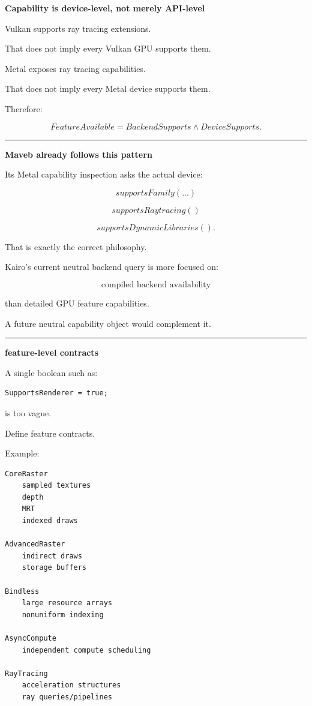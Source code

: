 \textbf{Capability is device-level, not merely API-level}

Vulkan supports ray tracing extensions.

That does not imply every Vulkan GPU supports them.

Metal exposes ray tracing capabilities.

That does not imply every Metal device supports them.

Therefore:

\[
\boxed{
FeatureAvailable
=
BackendSupports
\land
DeviceSupports.
}
\]

\begin{center}\rule{0.5\linewidth}{0.5pt}\end{center}

\textbf{Maveb already follows this pattern}

Its Metal capability inspection asks the actual device:

\[
supportsFamily(...)
\]

\[
supportsRaytracing()
\]

\[
supportsDynamicLibraries().
\]

That is exactly the correct philosophy.

Kairo's current neutral backend query is more focused on:

\[
\text{compiled backend availability}
\]

than detailed GPU feature capabilities.

A future neutral capability object would complement it.

\begin{center}\rule{0.5\linewidth}{0.5pt}\end{center}

\textbf{feature-level contracts}

A single boolean such as:

\begin{verbatim}
SupportsRenderer = true;
\end{verbatim}

is too vague.

Define feature contracts.

Example:

\begin{verbatim}
CoreRaster
    sampled textures
    depth
    MRT
    indexed draws

AdvancedRaster
    indirect draws
    storage buffers

Bindless
    large resource arrays
    nonuniform indexing

AsyncCompute
    independent compute scheduling

RayTracing
    acceleration structures
    ray queries/pipelines
\end{verbatim}


